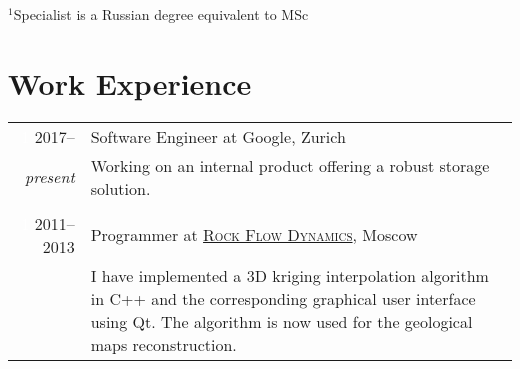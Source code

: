 \documentclass[a4paper,10pt]{article}
\begin{document}
\footnotesize{$^1$Specialist is a Russian degree equivalent to MSc}
\normalsize

\section{Work Experience}
\begin{tabular}{r|p{13cm}}
    \textcolor{white}{1} 2017-- & Software Engineer at Google, Zurich \\
    \emph{present} & Working on an internal product offering a robust storage solution. \\

    \multicolumn{2}{c}{} \\

    \textcolor{white}{1} 2011--2013 & Programmer at
    \href{http://rfdyn.com/}{\textsc{Rock Flow Dynamics}}, Moscow \\
    & \footnotesize {I have implemented a 3D kriging interpolation algorithm in
    C++ and the corresponding graphical user interface using Qt. The algorithm
    is now used for the geological maps reconstruction.} \\
\end{tabular}
\end{document}
